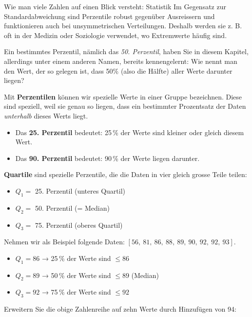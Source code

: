 \begin{lpu}{Wie man viele Zahlen auf einen Blick versteht: Statistik}
Im Gegensatz zur Standardabweichung sind Perzentile robust gegenüber Ausreissern und funktionieren auch bei unsymmetrischen Verteilungen. Deshalb werden sie z. B. oft in der Medizin oder Soziologie verwendet, wo Extremwerte häufig sind.

\begin{aufgabe}{3}
Ein bestimmtes Perzentil, nämlich das \textit{50. Perzentil}, haben Sie in diesem Kapitel, allerdings unter einem anderen Namen, bereits kennengelernt: Wie nennt man den Wert, der so gelegen ist, dass 50\% (also die Hälfte) aller Werte darunter liegen?
\end{aufgabe}


\begin{theorie}
Mit \textbf{Perzentilen} können wir spezielle Werte in einer Gruppe bezeichnen. Diese sind speziell, weil sie genau so liegen, dass ein bestimmter Prozentsatz der Daten \emph{unterhalb} dieses Werts liegt.

\begin{itemize}
  \item Das \textbf{25. Perzentil} bedeutet: 25\,\% der Werte sind kleiner oder gleich diesem Wert.
  \item Das \textbf{90. Perzentil} bedeutet: 90\,\% der Werte liegen darunter.
\end{itemize}

\textbf{Quartile} sind spezielle Perzentile, die die Daten in vier gleich grosse Teile teilen:
\begin{itemize}
  \item $Q_1 =$ 25. Perzentil (unteres Quartil)
  \item $Q_2 =$ 50. Perzentil  (= Median)
  \item $Q_3 =$ 75. Perzentil (oberes Quartil)
\end{itemize}
\end{theorie}

Nehmen wir als Beispiel folgende Daten: $[56,\ 81,\ 86,\ 88,\ 89,\ 90,\ 92,\ 92,\ 93]$.

\begin{itemize}
  \item $Q_1 = 86$ → 25\,\% der Werte sind $\leq 86$
  \item $Q_2 = 89$ → 50\,\% der Werte sind $\leq 89$ (Median)
  \item $Q_3 = 92$ → 75\,\% der Werte sind $\leq 92$
\end{itemize}


\begin{aufgabe}{4}
Erweitern Sie die obige Zahlenreihe auf zehn Werte durch Hinzufügen von 94:


\end{aufgabe}
\end{lpu}
